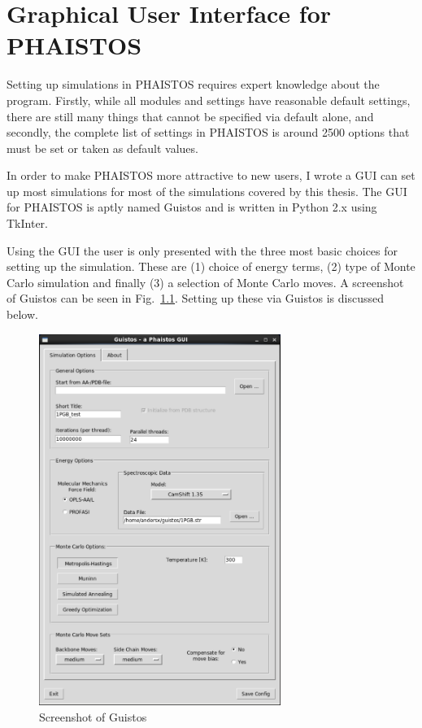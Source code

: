 \chapter{Graphical User Interface for PHAISTOS}

Setting up simulations in PHAISTOS requires expert knowledge about the program. 
Firstly, while all modules and settings have reasonable default settings, there are still many things that cannot be specified via default alone, and secondly, the complete list of settings in PHAISTOS is around 2500 options that must be set or taken as default values.

In order to make PHAISTOS more attractive to new users, I wrote a GUI can set up most simulations for most of the simulations covered by this thesis.
The GUI for PHAISTOS is aptly named Guistos and is written in Python 2.x using TkInter.

Using the GUI the user is only presented with the three most basic choices for setting up the simulation.
These are (1) choice of energy terms, (2) type of Monte Carlo simulation and finally (3) a selection of Monte Carlo moves.
A screenshot of Guistos can be seen in Fig.~\ref{fig:guistos}.
Setting up these via Guistos is discussed below.

\begin{figure}
    \centering
    \includegraphics[width=0.70\textwidth]{figures/guistos.pdf}
    \caption{Screenshot of Guistos}
    \label{fig:guistos}
\end{figure}

